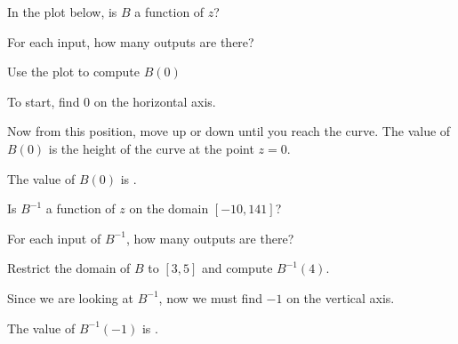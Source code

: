 \begin{question}
In the plot below, is $B$ a function of $z$?
\begin{figure}[h]
\begin{center}
\end{center}
\end{figure}
\begin{multiple-choice}
\end{multiple-choice}
\begin{solution}
\begin{hint}
For each input, how many outputs are there?
\end{hint}
\end{solution}
Use the plot to compute $B(0)$
\begin{solution}
\begin{hint}
To start, find $0$ on the horizontal axis. 
\end{hint}
\begin{hint}
Now from this position, move up or down until you reach the curve. The value of $B(0)$ is the height of the curve at the point $z=0$.
\end{hint}
The value of $B(0)$ is .
\end{solution}
Is $B^{-1}$ a function of $z$ on the domain $[-10,141]$?
\begin{multiple-choice}
\end{multiple-choice}
\begin{solution}
\begin{hint}
For each input of $B^{-1}$, how many outputs are there?
\end{hint}
\end{solution}
Restrict the domain of $B$ to $[3,5]$ and compute $B^{-1}(4)$.
\begin{solution}
\begin{hint}
Since we are looking at $B^{-1}$, now we must find $-1$ on the vertical axis. 
\end{hint}
The value of $B^{-1}(-1)$ is .
\end{solution}
\end{question}
